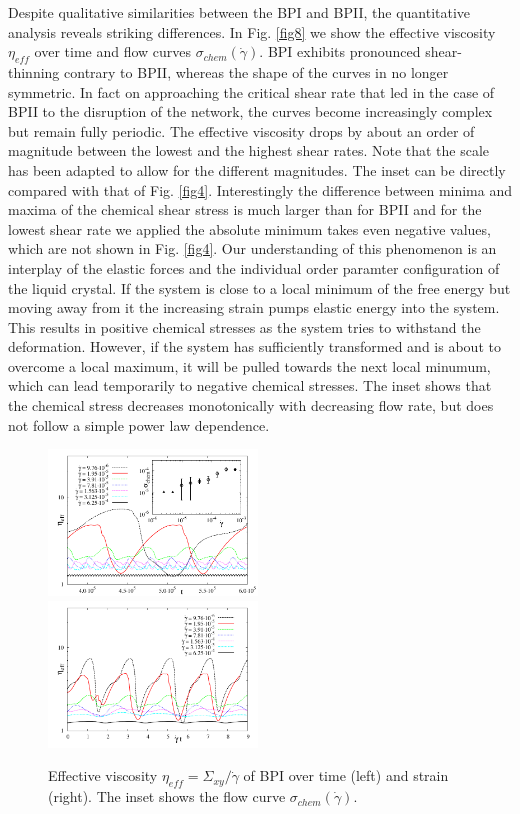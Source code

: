\documentclass[aps,pre,reprint,superscriptaddress]{revtex4}
\begin{document}
Despite qualitative similarities between the BPI and BPII, the quantitative analysis reveals striking differences.
In Fig. \ref{fig8} we show the effective viscosity $\eta_{eff}$ over time and flow curves $\sigma_{chem}(\dot{\gamma})$. 
BPI exhibits pronounced shear-thinning contrary to BPII, whereas the shape of the curves in no longer symmetric.
In fact on approaching the critical shear rate that led in the case of BPII to the disruption of the network, the curves become increasingly complex but remain fully periodic.
The effective viscosity drops by about an order of magnitude between the lowest and the highest shear rates.
Note that the scale has been adapted to allow for the different magnitudes.
The inset can be directly compared with that of Fig. \ref{fig4}.
Interestingly the difference between minima and maxima of the chemical shear stress is much larger than for BPII and for the lowest shear rate we applied the absolute minimum takes even negative values, which are not shown in Fig. \ref{fig4}.
Our understanding of this phenomenon is an interplay of the elastic forces and the individual order paramter configuration of the liquid crystal.
If the system is close to a local minimum of the free energy but moving away from it the increasing strain pumps elastic energy into the system. 
This results in positive chemical stresses as the system tries to withstand the deformation.
However, if the system has sufficiently transformed and is about to overcome a local maximum, it will be pulled towards the next local minumum, which can lead temporarily to negative chemical stresses. 
The inset shows that the chemical stress decreases monotonically with decreasing flow rate, but does not follow a simple power law dependence.
 
\begin{figure}[h]
\includegraphics[width=0.495\textwidth]{stress_bp1.pdf}
\includegraphics[width=0.495\textwidth]{stress_vs_strain_bp1.pdf}
\caption{Effective viscosity $\eta_{eff}=\Sigma_{xy}/\dot{\gamma}$ of BPI over time (left) and strain (right). The inset shows the flow curve $\sigma_{chem}(\dot{\gamma})$.}
\label{bp1-rheo}
\end{figure}
\end{document}
